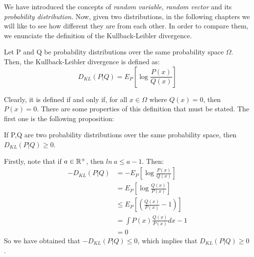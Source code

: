 We have introduced the concepts of \emph{random variable},  \emph{random vector} and its \emph{probability distribution}.  Now, given two distributions, in the following chapters we will like to see how different they are from each other.
In order to compare them, we enunciate the definition of the Kullback-Leibler divergence.

\begin{ndef}
Let P and Q be probability distributions over the same probability space $\Omega$. Then, the Kullback-Leibler divergence is defined as:
$$
D_{KL}(P|Q) = E_P[\log{\frac{P(x)}{Q(x)}}]
$$
\end{ndef}
Clearly, it is defined if and only if, for all $x\in \Omega$ where $Q(x) = 0$, then $P(x) = 0$. There are some properties of this definition that must be stated. The first one is the following proposition:

\begin{nprop}
If P,Q are two probability distributions over the same probability space, then $D_{KL}(P|Q) \geq 0$.
\end{nprop}
\begin{nproof}
Firstly, note that if $a \in \mathbb{R}^+$, then $ln\ a \leq a-1$. Then:
\begin{align*}
-D_{KL}(P|Q) & = - E_P[\log{\frac{P(x)}{Q(x)}}] \\
             & = E_P[\log{\frac{Q(x)}{P(x)}}] \\
             & \leq E_P[(\frac{Q(x)}{P(x)} - 1)]\\
             & = \int P(x) \frac{Q(x)}{P(x)} dx -1 \\
             & = 0
\end{align*}
So we have obtained that $-D_{KL}(P|Q) \leq 0$, which implies that $D_{KL}(P|Q) \geq 0$.
\end{nproof}